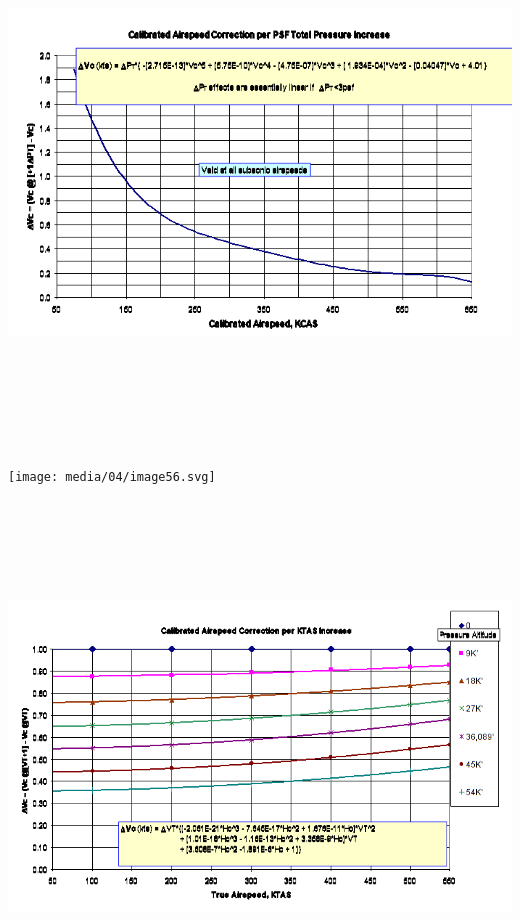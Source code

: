 \documentclass[
]{book}
\begin{document}
\includegraphics[width=8.6875in,height=5.73819in]{media/04/image55.png}

\texttt{[image: media/04/image56.svg]}

\includegraphics[width=9in,height=5.33889in]{media/04/image57.png}
\end{document}
